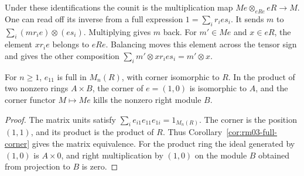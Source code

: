 Under these identifications the counit is the multiplication map
\(Me\otimes_{eRe}eR\to M\). One can read off its inverse from a full
expression \(1=\sum_i r_i e s_i\). It sends \(m\) to
\(\sum_i (m r_i e)\otimes(e s_i)\). Multiplying gives \(m\) back.
For \(m'\in Me\) and \(x\in eR\), the element \(x r_i e\) belongs to
\(eRe\). Balancing moves this element across the tensor sign and
gives the other composition
\(\sum_i m'\otimes x r_i e s_i=m'\otimes x\).

\begin{example}
\label{ex:rm03-corners}
For \(n\geq 1\), \(e_{11}\) is full in \(M_n(R)\), with corner
isomorphic to \(R\). In the product of two nonzero rings \(A\times B\),
the corner of \(e=(1,0)\) is isomorphic to \(A\), and the corner
functor \(M\mapsto Me\) kills the nonzero right module \(B\).
\end{example}
\begin{proof}
The matrix units satisfy \(\sum_i e_{i1}e_{11}e_{1i}=1_{M_n(R)}\).
The corner is the position \((1,1)\), and its product is the product
of \(R\). Thus Corollary~\ref{cor:rm03-full-corner} gives the matrix
equivalence. For the product ring the ideal generated by \((1,0)\)
is \(A\times 0\), and right multiplication by \((1,0)\) on the
module \(B\) obtained from projection to \(B\) is zero.
\end{proof}
